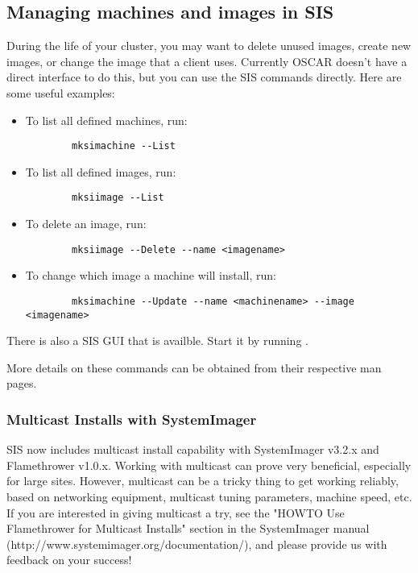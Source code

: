 %
%
% 
% 
% 
% 
%

\subsection{Managing machines and images in SIS}
\label{app:troubleshooting-machines-images}

During the life of your cluster, you may want to delete unused
images, create new images, or change the image that a
client uses.  Currently OSCAR doesn't have a direct interface to do
this, but you can use the SIS commands directly. Here are some useful
examples:

\begin{itemize}
\item To list all defined machines, run:
\begin{verbatim}
        mksimachine --List
\end{verbatim}
\item To list all defined images, run:
\begin{verbatim}
        mksiimage --List
\end{verbatim}
\item To delete an image, run:
\begin{verbatim}
        mksiimage --Delete --name <imagename>
\end{verbatim}
\item To change which image a machine will install, run:
\begin{verbatim}
        mksimachine --Update --name <machinename> --image <imagename>
\end{verbatim}
\end{itemize}

There is also a SIS GUI that is availble. Start it by running
. 

More details on these commands can be obtained from their respective
man pages.

\subsubsection{Multicast Installs with SystemImager}
SIS now includes multicast install capability with SystemImager v3.2.x
and Flamethrower v1.0.x.  Working with multicast can prove very
beneficial, especially for large sites.  However, multicast can be a
tricky thing to get working reliably, based on networking equipment,
multicast tuning parameters, machine speed, etc.  If you are interested
in giving multicast a try, see the "HOWTO Use Flamethrower for Multicast
Installs" section in the SystemImager manual (http://www.systemimager.org/documentation/), and please provide us with feedback on your success!

